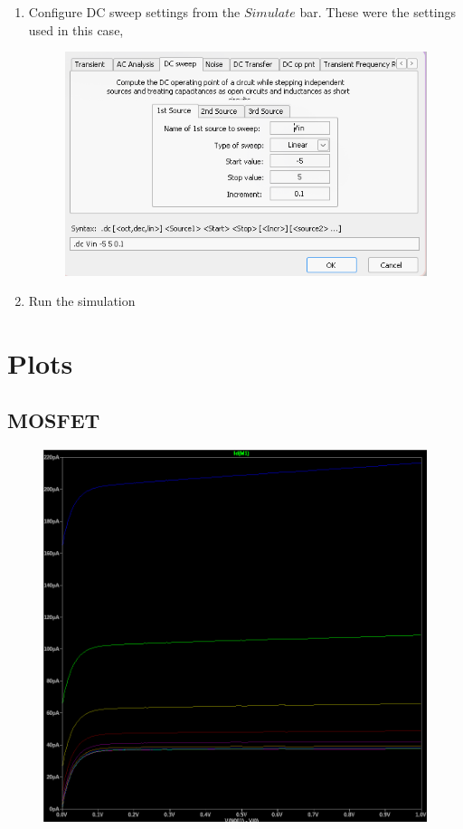 \documentclass[12pt,a4paper]{report}
\begin{document}
\begin{enumerate}
\begin{figure}[h!]
    \end{figure}
    \newline
    \item Configure DC sweep settings from the $Simulate$ bar. These were the settings used in this case,
    \begin{figure}[ht!]
        \centering
        \includegraphics[width=0.5\linewidth]{figs/diode-sweep.png}
        \label{fig:placeholder}
    \end{figure}
    
    \item Run the simulation
\end{enumerate}
\pagebreak
\section{Plots}
    \subsection{MOSFET}
    \begin{figure}[h!]
        \centering
        \includegraphics[width=1\linewidth]{figs/mosfet-plot.png}
    \end{figure}
    \pagebreak
\end{document}
